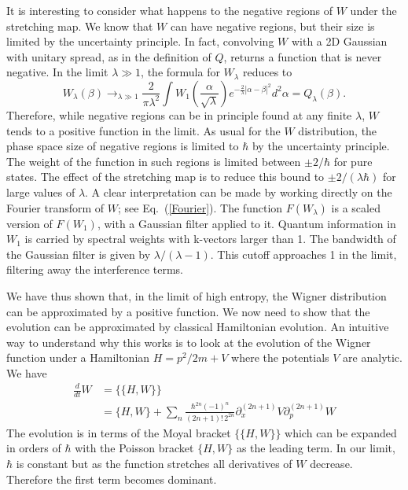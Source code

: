 \documentclass{article}
\begin{document}
It is interesting to consider what happens to the negative regions of $W$ under the stretching map. We know that $W$ can have negative regions, but their size is limited by the uncertainty principle. In fact, convolving $W$ with a 2D Gaussian with unitary spread, as in the definition of $Q$, returns a function that is never negative. In the limit $\lambda\gg1$, the formula for $W_\lambda$ reduces to
\begin{equation}
     W_\lambda(\beta)\rightarrow_{\lambda\gg1}\frac{2}{\pi\lambda^2}\int W_1\left(\frac{\alpha}{\sqrt{\lambda}}\right)e^{-\frac{2}{\lambda}\left|\alpha-\beta\right|^2}d^2\alpha=Q_\lambda(\beta).
\end{equation}
Therefore, while negative regions can be in principle found at any finite $\lambda$, $W$ tends to a positive function in the limit. As usual for the $W$ distribution, the phase space size of negative regions is limited to $\hbar$ by the uncertainty principle. The weight of the function in such regions is limited between $\pm 2/\hbar$ for pure states. The effect of the stretching map is to reduce this bound to $\pm 2/(\lambda\hbar)$ for large values of $\lambda$. A clear interpretation can be made by working directly on the Fourier transform of $W$; see Eq.~(\ref{Fourier}). The function $F(W_\lambda)$ is a scaled version of $F(W_1)$, with a Gaussian filter applied to it. Quantum information in $W_1$ is carried by spectral weights with k-vectors larger than 1. The bandwidth of the Gaussian filter is given by $\lambda/(\lambda-1)$. This cutoff approaches 1 in the limit, filtering away the interference terms.

We have thus shown that, in the limit of high entropy, the Wigner distribution can be approximated by a positive function. We now need to show that the evolution can be approximated by classical Hamiltonian evolution. An intuitive way to understand why this works is to look at the evolution of the Wigner function under a Hamiltonian $H = p^2/2m + V$ where the potentials $V$ are analytic. We have~\cite{hillery1984distribution}
\begin{equation}
\begin{aligned}
    \frac{d}{dt} W &= \{\{H, W\}\} \\
    &= \{H, W\} + \sum_n \frac{\hbar^{2n} (-1)^n}{(2n+1)! \, 2^{2n}} \partial_x^{(2n+1)} V \partial_p^{(2n+1)} W
\end{aligned}
\end{equation}
The evolution is in terms of the Moyal bracket $\{\{H,W\}\}$ which can be expanded in orders of $\hbar$ with the Poisson bracket $\{H,W\}$ as the leading term. In our limit, $\hbar$ is constant but as the function stretches all derivatives of $W$ decrease. Therefore the first term becomes dominant.
\end{document}
